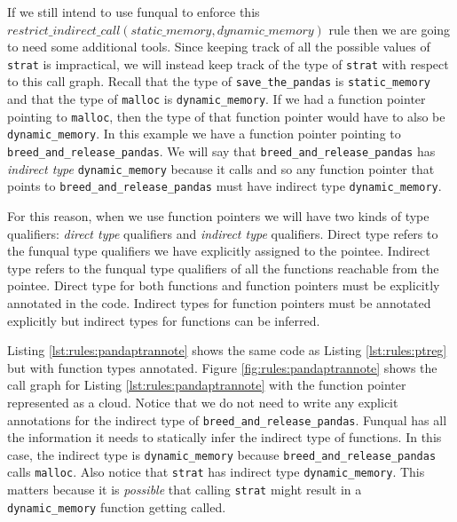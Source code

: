 \begin{sloppypar}
If we still intend to use funqual to enforce this $restrict\_indirect\_call(\allowbreak static\_memory, dynamic\_memory)$ rule then we are going to need some additional tools.  Since keeping track of all the possible values of \lstinline{strat} is impractical, we will instead keep track of the type of \lstinline{strat} with respect to this call graph.  Recall that the type of \lstinline{save_the_pandas} is \lstinline{static_memory} and that the type of \lstinline{malloc} is \lstinline{dynamic_memory}.  If we had a function pointer pointing to \lstinline{malloc}, then the type of that function pointer would have to also be \lstinline{dynamic_memory}.  In this example we have a function pointer pointing to \lstinline{breed_and_release_pandas}.  We will say that \lstinline{breed_and_release_pandas} has \textit{indirect type} \lstinline{dynamic_memory} because it calls  and so any function pointer that points to \lstinline{breed_and_release_pandas} must have indirect type \lstinline{dynamic_memory}.
\end{sloppypar}

For this reason, when we use function pointers we will have two kinds of type qualifiers:  \textit{direct type} qualifiers and \textit{indirect type} qualifiers.  Direct type refers to the funqual type qualifiers we have explicitly assigned to the pointee.  Indirect type refers to the funqual type qualifiers of all the functions reachable from the pointee.  Direct type for both functions and function pointers must be explicitly annotated in the code.  Indirect types for function pointers must be annotated explicitly but indirect types for functions can be inferred. 

Listing \ref{lst:rules:pandaptrannote} shows the same code as Listing \ref{lst:rules:ptreg} but with function types annotated.  Figure \ref{fig:rules:pandaptrannote} shows the call graph for Listing \ref{lst:rules:pandaptrannote} with the function pointer represented as a cloud.  Notice that we do not need to write any explicit annotations for the indirect type of \lstinline{breed_and_release_pandas}.  Funqual has all the information it needs to statically infer the indirect type of functions.  In this case, the indirect type is \lstinline{dynamic_memory} because \lstinline{breed_and_release_pandas} calls \lstinline{malloc}.  Also notice that \lstinline{strat} has indirect type \lstinline{dynamic_memory}.  This matters because it is \textit{possible} that calling \lstinline{strat} might result in a \lstinline{dynamic_memory} function getting called.  

